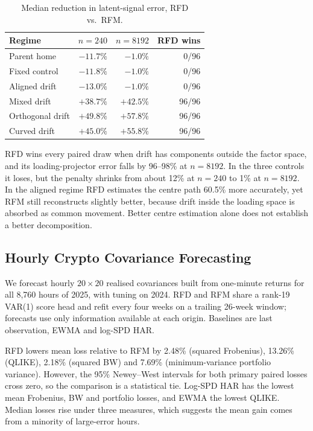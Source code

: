 \documentclass[journal]{IEEEtran}
\begin{document}
\begin{table}[t]
\centering
\caption{Median reduction in latent-signal error, RFD vs.\ RFM.}
\label{tab:synth}
\begin{tabular}{lrrr}
\toprule
Regime & $n=240$ & $n=8192$ & RFD wins \\
\midrule
Parent home & $-11.7\%$ & $-1.0\%$ & 0/96 \\
Fixed control & $-11.8\%$ & $-1.0\%$ & 0/96 \\
Aligned drift & $-13.0\%$ & $-1.0\%$ & 0/96 \\
Mixed drift & $+38.7\%$ & $+42.5\%$ & 96/96 \\
Orthogonal drift & $+49.8\%$ & $+57.8\%$ & 96/96 \\
Curved drift & $+45.0\%$ & $+55.8\%$ & 96/96 \\
\bottomrule
\end{tabular}
\end{table}

RFD wins every paired draw when drift has components outside the factor
space, and its loading-projector error falls by 96--98\% at $n=8192$. In
the three controls it loses, but the penalty shrinks from about 12\% at
$n=240$ to 1\% at $n=8192$.
In the aligned regime RFD estimates the centre path 60.5\% more accurately,
yet RFM still reconstructs slightly better, because drift inside the
loading space is absorbed as common movement. Better centre estimation
alone does not establish a better decomposition.

\subsection{Hourly Crypto Covariance Forecasting}
We forecast hourly $20\times20$ realised covariances built from one-minute
returns for all 8,760 hours of 2025, with tuning on 2024. RFD and RFM share
a rank-19 VAR(1) score head and refit every four weeks on a trailing 26-week
window; forecasts use only information available at each origin. Baselines
are last observation, EWMA and log-SPD HAR.

RFD lowers mean loss relative to RFM by 2.48\% (squared Frobenius),
13.26\% (QLIKE), 2.18\% (squared BW) and 7.69\% (minimum-variance portfolio
variance). However, the 95\% Newey--West intervals for both primary paired
losses cross zero, so the comparison is a statistical tie. Log-SPD HAR has
the lowest mean Frobenius, BW and portfolio losses, and EWMA the lowest
QLIKE. Median losses rise under three measures, which suggests the mean
gain comes from a minority of large-error hours.
\end{document}
